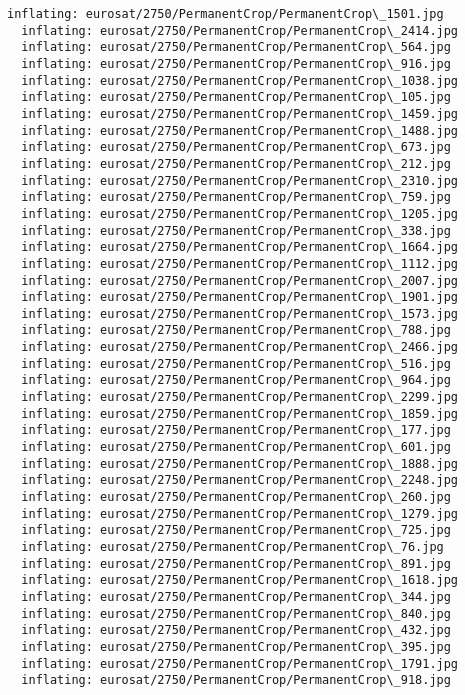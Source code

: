\documentclass[11pt]{article}
\begin{document}
\begin{Verbatim}[commandchars=\\\{\}]
  inflating: eurosat/2750/PermanentCrop/PermanentCrop\_1501.jpg
  inflating: eurosat/2750/PermanentCrop/PermanentCrop\_2414.jpg
  inflating: eurosat/2750/PermanentCrop/PermanentCrop\_564.jpg
  inflating: eurosat/2750/PermanentCrop/PermanentCrop\_916.jpg
  inflating: eurosat/2750/PermanentCrop/PermanentCrop\_1038.jpg
  inflating: eurosat/2750/PermanentCrop/PermanentCrop\_105.jpg
  inflating: eurosat/2750/PermanentCrop/PermanentCrop\_1459.jpg
  inflating: eurosat/2750/PermanentCrop/PermanentCrop\_1488.jpg
  inflating: eurosat/2750/PermanentCrop/PermanentCrop\_673.jpg
  inflating: eurosat/2750/PermanentCrop/PermanentCrop\_212.jpg
  inflating: eurosat/2750/PermanentCrop/PermanentCrop\_2310.jpg
  inflating: eurosat/2750/PermanentCrop/PermanentCrop\_759.jpg
  inflating: eurosat/2750/PermanentCrop/PermanentCrop\_1205.jpg
  inflating: eurosat/2750/PermanentCrop/PermanentCrop\_338.jpg
  inflating: eurosat/2750/PermanentCrop/PermanentCrop\_1664.jpg
  inflating: eurosat/2750/PermanentCrop/PermanentCrop\_1112.jpg
  inflating: eurosat/2750/PermanentCrop/PermanentCrop\_2007.jpg
  inflating: eurosat/2750/PermanentCrop/PermanentCrop\_1901.jpg
  inflating: eurosat/2750/PermanentCrop/PermanentCrop\_1573.jpg
  inflating: eurosat/2750/PermanentCrop/PermanentCrop\_788.jpg
  inflating: eurosat/2750/PermanentCrop/PermanentCrop\_2466.jpg
  inflating: eurosat/2750/PermanentCrop/PermanentCrop\_516.jpg
  inflating: eurosat/2750/PermanentCrop/PermanentCrop\_964.jpg
  inflating: eurosat/2750/PermanentCrop/PermanentCrop\_2299.jpg
  inflating: eurosat/2750/PermanentCrop/PermanentCrop\_1859.jpg
  inflating: eurosat/2750/PermanentCrop/PermanentCrop\_177.jpg
  inflating: eurosat/2750/PermanentCrop/PermanentCrop\_601.jpg
  inflating: eurosat/2750/PermanentCrop/PermanentCrop\_1888.jpg
  inflating: eurosat/2750/PermanentCrop/PermanentCrop\_2248.jpg
  inflating: eurosat/2750/PermanentCrop/PermanentCrop\_260.jpg
  inflating: eurosat/2750/PermanentCrop/PermanentCrop\_1279.jpg
  inflating: eurosat/2750/PermanentCrop/PermanentCrop\_725.jpg
  inflating: eurosat/2750/PermanentCrop/PermanentCrop\_76.jpg
  inflating: eurosat/2750/PermanentCrop/PermanentCrop\_891.jpg
  inflating: eurosat/2750/PermanentCrop/PermanentCrop\_1618.jpg
  inflating: eurosat/2750/PermanentCrop/PermanentCrop\_344.jpg
  inflating: eurosat/2750/PermanentCrop/PermanentCrop\_840.jpg
  inflating: eurosat/2750/PermanentCrop/PermanentCrop\_432.jpg
  inflating: eurosat/2750/PermanentCrop/PermanentCrop\_395.jpg
  inflating: eurosat/2750/PermanentCrop/PermanentCrop\_1791.jpg
  inflating: eurosat/2750/PermanentCrop/PermanentCrop\_918.jpg

\end{Verbatim}
\end{document}
